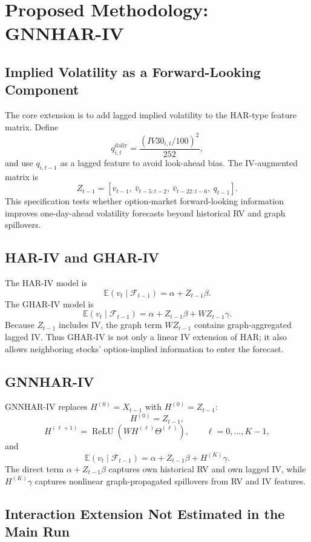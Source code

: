\documentclass[11pt,a4paper]{article}
\begin{document}
\section{Proposed Methodology: GNNHAR-IV}
\label{sec:methodology}

\subsection{Implied Volatility as a Forward-Looking Component}
\label{subsec:iv-component}

The core extension is to add lagged implied volatility to the HAR-type feature matrix.  Define
\[
q_{i,t}^{\mathrm{daily}}
=
\frac{(IV30_{i,t}/100)^2}{252},
\]
and use \(q_{i,t-1}\) as a lagged feature to avoid look-ahead bias.  The IV-augmented matrix is
\[
Z_{t-1}
=
\left[
v_{t-1},\
\bar v_{t-5:t-2},\
\bar v_{t-22:t-6},\
q_{t-1}
\right].
\]
This specification tests whether option-market forward-looking information improves one-day-ahead volatility forecasts beyond historical RV and graph spillovers.

\subsection{HAR-IV and GHAR-IV}
\label{subsec:hariv-ghariv}

The HAR-IV model is
\[
\mathbb{E}(v_t\mid\mathcal{F}_{t-1})
=
\alpha + Z_{t-1}\beta.
\]
The GHAR-IV model is
\[
\mathbb{E}(v_t\mid\mathcal{F}_{t-1})
=
\alpha + Z_{t-1}\beta + WZ_{t-1}\gamma.
\]
Because \(Z_{t-1}\) includes IV, the graph term \(WZ_{t-1}\) contains graph-aggregated lagged IV.  Thus GHAR-IV is not only a linear IV extension of HAR; it also allows neighboring stocks' option-implied information to enter the forecast.

\subsection{GNNHAR-IV}
\label{subsec:gnnhariv}

GNNHAR-IV replaces \(H^{(0)}=X_{t-1}\) with \(H^{(0)}=Z_{t-1}\):
\[
H^{(0)}=Z_{t-1},
\]
\[
H^{(\ell+1)}
=
\operatorname{ReLU}\!\left(W H^{(\ell)}\Theta^{(\ell)}\right),
\qquad
\ell=0,\ldots,K-1,
\]
and
\[
\mathbb{E}(v_t\mid\mathcal{F}_{t-1})
=
\alpha + Z_{t-1}\beta + H^{(K)}\gamma.
\]
The direct term \(\alpha+Z_{t-1}\beta\) captures own historical RV and own lagged IV, while \(H^{(K)}\gamma\) captures nonlinear graph-propagated spillovers from RV and IV features.

\subsection{Interaction Extension Not Estimated in the Main Run}
\label{subsec:interaction}
\end{document}
